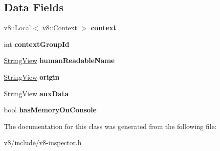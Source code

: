 \subsection*{Data Fields}
\begin{DoxyCompactItemize}
\item 
\mbox{\label{classv8__inspector_1_1V8ContextInfo_a24c69a2cb86febdcd30605f9edea8b21}} 
\mbox{\hyperlink{classv8_1_1Local}{v8\+::\+Local}}$<$ \mbox{\hyperlink{classv8_1_1Context}{v8\+::\+Context}} $>$ {\bfseries context}
\item 
\mbox{\label{classv8__inspector_1_1V8ContextInfo_a4958fb8bfe5ec4aa77ebdfe29b1e9a30}} 
int {\bfseries context\+Group\+Id}
\item 
\mbox{\label{classv8__inspector_1_1V8ContextInfo_a393412db9d07a12be7b4bf8f3465b8fd}} 
\mbox{\hyperlink{classv8__inspector_1_1StringView}{String\+View}} {\bfseries human\+Readable\+Name}
\item 
\mbox{\label{classv8__inspector_1_1V8ContextInfo_acd3feac7585871ae24b2cf910140b743}} 
\mbox{\hyperlink{classv8__inspector_1_1StringView}{String\+View}} {\bfseries origin}
\item 
\mbox{\label{classv8__inspector_1_1V8ContextInfo_afda75b31c49cd9f4e664ec7068979d9a}} 
\mbox{\hyperlink{classv8__inspector_1_1StringView}{String\+View}} {\bfseries aux\+Data}
\item 
\mbox{\label{classv8__inspector_1_1V8ContextInfo_a2c523d93043e7f4b018c470dad60b41f}} 
bool {\bfseries has\+Memory\+On\+Console}
\end{DoxyCompactItemize}


The documentation for this class was generated from the following file\+:\begin{DoxyCompactItemize}
\item 
v8/include/v8-\/inspector.\+h\end{DoxyCompactItemize}
